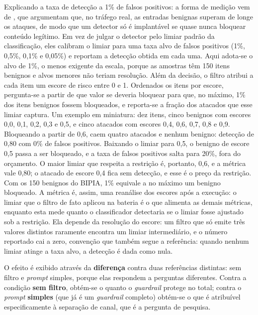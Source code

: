 Explicando a taxa de detecção a 1\% de falsos positivos: a forma de medição
vem de , que argumentam que, no tráfego
real, as entradas benignas superam de longe os ataques, de modo que um
detector só é implantável se quase nunca bloquear conteúdo legítimo. Em vez
de julgar o detector pelo limiar padrão da classificação, eles calibram o
limiar para uma taxa alvo de falsos positivos (1\%, 0{,}5\%, 0{,}1\% e
0{,}05\%) e reportam a detecção obtida em cada uma. Aqui adota-se o alvo de
1\%, o menos exigente da escala, porque as amostras têm 150 itens benignos e
alvos menores não teriam resolução. Além da decisão, o filtro atribui a cada
item um escore de risco entre 0 e 1. Ordenados os itens por escore,
pergunta-se a partir de que valor se deveria bloquear para que, no máximo,
1\% dos itens benignos fossem bloqueados, e reporta-se a fração dos atacados
que esse limiar captura. Um exemplo em miniatura: dez itens, cinco
benignos com escores 0{,}0, 0{,}1, 0{,}2, 0{,}3 e 0{,}5, e cinco atacados com
escores 0{,}4, 0{,}6, 0{,}7, 0{,}8 e 0{,}9. Bloqueando a partir de 0{,}6,
caem quatro atacados e nenhum benigno: detecção de 0{,}80 com 0\% de falsos
positivos. Baixando o limiar para 0{,}5, o benigno de escore 0{,}5 passa a
ser bloqueado, e a taxa de falsos positivos salta para 20\%, fora do
orçamento. O maior limiar que respeita a restrição é, portanto, 0{,}6, e a
métrica vale 0{,}80; o atacado de escore 0{,}4 fica sem detecção, e esse é o
preço da restrição. Com os 150 benignos do BIPIA, 1\% equivale a no máximo
um benigno bloqueado. A métrica é, assim, uma reanálise dos escores após a
execução: o limiar que o filtro de fato aplicou na bateria é o que alimenta
as demais métricas, enquanto esta mede quanto o classificador detectaria se o
limiar fosse ajustado sob a restrição. Ela depende da resolução do escore: um
filtro que só emite três valores distintos raramente encontra um limiar
intermediário, e o número reportado cai a zero, convenção que também segue
a referência: quando nenhum limiar atinge a taxa alvo, a detecção é dada
como nula.

O efeito é exibido através da \textbf{diferença} contra duas referências distintas: 
sem filtro e \textit{prompt} simples, porque elas respondem a perguntas diferentes. 
Contra a condição \textbf{sem filtro}, obtém-se o quanto o \textit{guardrail} protege no total; contra o
\textit{prompt} \textbf{simples} (que já é um \textit{guardrail} completo)
obtém-se o que é atribuível especificamente à separação de canal, que é a
pergunta de pesquisa.

